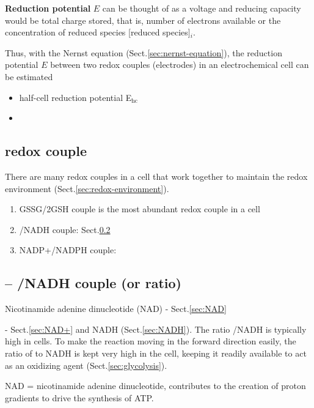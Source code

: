{\bf Reduction potential} $E$ can be thought of as a voltage and reducing
capacity would be total charge stored, that is, number of electrons available or
the concentration of reduced species [reduced species]$_i$.

Thus, with the Nernst equation (Sect.\ref{sec:nernst-equation}), the reduction
potential $E$ between two redox couples (electrodes) in an electrochemical cell
can be estimated
\begin{itemize}
  \item half-cell reduction potential E$_{\text{hc}}$

  \item
\end{itemize}




\subsection{redox couple}
\label{sec:redox-couple}

There are many redox couples in a cell that work together to maintain the redox
environment (Sect.\ref{sec:redox-environment}).

\begin{enumerate}
  \item  GSSG/2GSH couple is the most abundant redox couple in a cell

  \item {}/NADH couple: Sect.\ref{sec:NAD+-NADH-couple}

  \item NADP+/NADPH couple:
\end{enumerate}

\subsection{-- /NADH couple (or ratio)}
\label{sec:NAD+-NADH-couple}
\label{sec:NAD+-NADH-ratio}

Nicotinamide adenine dinucleotide (NAD) - Sect.\ref{sec:NAD}


 - Sect.\ref{sec:NAD+} and NADH (Sect.\ref{sec:NADH}).
The ratio /NADH is typically high in cells. To make the reaction moving in
the forward direction easily, the ratio of  to NADH is kept very high in the
cell, keeping it readily available to act as an oxidizing agent
(Sect.\ref{sec:glycolysis}).

NAD = nicotinamide adenine dinucleotide, contributes to the creation of proton
gradients to drive the synthesis of ATP.

